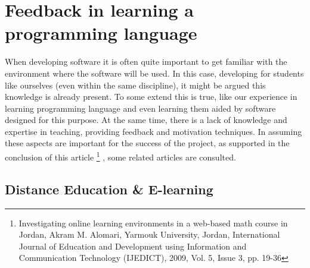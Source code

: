 \documentclass{article}
\begin{document}
\section{Feedback in learning a programming language}
When developing software it is often quite important to get familiar with the 
environment where the software will be used. In this case, developing for
students like ourselves (even within the same discipline), it might be argued
this knowledge is already present. To some extend this is true, like our
experience in learning programming language and even learning them aided by 
software designed for this purpose. At the same time, there is a lack of
knowledge and expertise in teaching, providing feedback and 
motivation techniques. In assuming these aspects are important for the success
of the project, as supported in the conclusion of this article
\footnote{Investigating online learning 
environments in a web-based math course in Jordan,
Akram M. Alomari, Yarmouk University, Jordan, International Journal of Education
and Development using Information and Communication Technology
(IJEDICT), 2009, Vol. 5, Issue 3, pp. 19-36}
 , some related articles are consulted.

\subsection{Distance Education \& E-learning}
\end{document}
